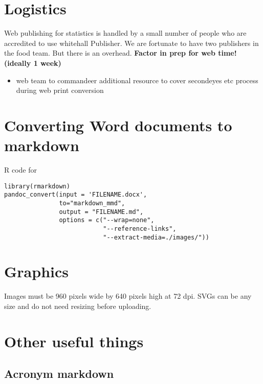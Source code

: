 \documentclass[
]{book}
\providecommand{\tightlist}{%
  \setlength{\itemsep}{0pt}\setlength{\parskip}{0pt}}
\begin{document}
\hypertarget{logistics}{%
\section{Logistics}\label{logistics}}

Web publishing for statistics is handled by a small number of people who are accredited to use whitehall Publisher. We are fortunate to have two publishers in the food team. But there is an overhead. \textbf{Factor in prep for web time! (ideally 1 week)}

\begin{itemize}
\tightlist
\item
  web team to commandeer additional resource to cover secondeyes etc process during web print conversion
\end{itemize}

\hypertarget{converting-word-documents-to-markdown}{%
\section{Converting Word documents to markdown}\label{converting-word-documents-to-markdown}}

R code for

\begin{verbatim}
library(rmarkdown)
pandoc_convert(input = 'FILENAME.docx',
               to="markdown_mmd",
               output = "FILENAME.md", 
               options = c("--wrap=none",
                           "--reference-links",
                           "--extract-media=./images/"))
\end{verbatim}

\hypertarget{graphics}{%
\section{Graphics}\label{graphics}}

Images must be 960 pixels wide by 640 pixels high at 72 dpi.
SVGs can be any size and do not need resizing before uploading.

\hypertarget{other-useful-things}{%
\section{Other useful things}\label{other-useful-things}}

\hypertarget{acronym-markdown}{%
\subsection{Acronym markdown}\label{acronym-markdown}}
\end{document}
